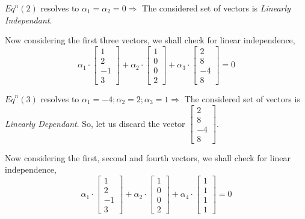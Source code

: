 \documentclass[a4paper]{article}
\begin{document}
\begin{qalist}
			${Eq}^{n} (2)$ resolves to ${\alpha}_{1} = {\alpha}_{2} = 0 \Rightarrow$ The considered set of vectors is \textit{Linearly Independant}.
			
			Now considering the first three vectors, we shall check for linear independence, 
			\begin{equation}
				{\alpha}_{1}\cdot\left[\begin{matrix}1 \\ 2 \\ -1 \\ 3\end{matrix}\right] + 
				{\alpha}_{2}\cdot\left[\begin{matrix}1 \\ 0 \\ 0 \\ 2\end{matrix}\right] + 
				{\alpha}_{3}\cdot\left[\begin{matrix}2 \\ 8 \\ -4 \\ 8\end{matrix}\right]
				 = 0
			\end{equation}
			
			${Eq}^{n} (3)$ resolves to ${\alpha}_{1} = -4 ; {\alpha}_{2} = 2 ; {\alpha}_{3} = 1 \Rightarrow$ The considered set of vectors is \textit{Linearly Dependant}. So, let us discard the vector $\left[\begin{matrix}2 \\ 8 \\ -4 \\ 8\end{matrix}\right]$. 
			
			Now considering the first, second and fourth vectors, we shall check for linear independence,
			\begin{equation}
				{\alpha}_{1}\cdot\left[\begin{matrix}1 \\ 2 \\ -1 \\ 3\end{matrix}\right] + 
				{\alpha}_{2}\cdot\left[\begin{matrix}1 \\ 0 \\ 0 \\ 2\end{matrix}\right] + 
				{\alpha}_{4}\cdot\left[\begin{matrix}1 \\ 1 \\ 1 \\ 1\end{matrix}\right]
				 = 0
			\end{equation}
			

\end{qalist}
\end{document}
